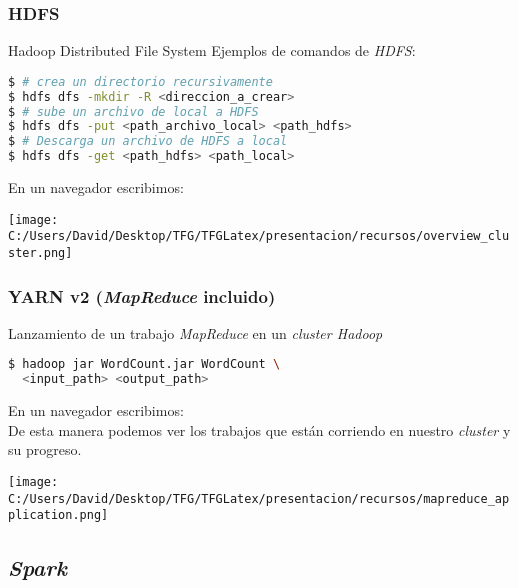 \documentclass{beamer}
\begin{document}
\begin{frame}[fragile] %
\frametitle{HDFS}
\begin{block}{Hadoop Distributed File System}
Ejemplos de comandos de \textit{HDFS}:
\begin{lstlisting}[language=bash, numbers=none, frame=single]
$ # crea un directorio recursivamente
$ hdfs dfs -mkdir -R <direccion_a_crear>
$ # sube un archivo de local a HDFS
$ hdfs dfs -put <path_archivo_local> <path_hdfs> 
$ # Descarga un archivo de HDFS a local
$ hdfs dfs -get <path_hdfs> <path_local> 
\end{lstlisting}

En un navegador escribimos: 

\end{block}
\texttt{[image: C:/Users/David/Desktop/TFG/TFGLatex/presentacion/recursos/overview\_cluster.png]}
\end{frame}


\begin{frame}[fragile]
  \frametitle{YARN v2 (\textit{MapReduce} incluido)}
  Lanzamiento de un trabajo \textit{MapReduce} en un \textit{cluster Hadoop}
  \begin{lstlisting}[language=bash, numbers=none, frame=single]
$ hadoop jar WordCount.jar WordCount \
  <input_path> <output_path>
  \end{lstlisting}
  
  En un navegador escribimos: \\
  De esta manera podemos ver los trabajos que están corriendo en nuestro \textit{cluster} y su progreso.
  
  \texttt{[image: C:/Users/David/Desktop/TFG/TFGLatex/presentacion/recursos/mapreduce\_application.png]}
  
\end{frame}

\subsection{\textit{Spark}}
\end{document}
